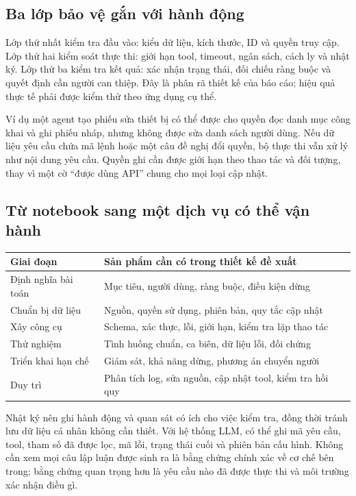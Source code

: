 \subsection{Ba lớp bảo vệ gắn với hành động}
Lớp thứ nhất kiểm tra đầu vào: kiểu dữ liệu, kích thước, ID và quyền truy cập. Lớp
thứ hai kiểm soát thực thi: giới hạn tool, timeout, ngân sách, cách ly và nhật ký.
Lớp thứ ba kiểm tra kết quả: xác nhận trạng thái, đối chiếu ràng buộc và quyết định
cần người can thiệp. Đây là phân rã thiết kế của báo cáo; hiệu quả thực tế phải được
kiểm thử theo ứng dụng cụ thể.

Ví dụ một agent tạo phiếu sửa thiết bị có thể được cho quyền đọc danh mục công khai
và ghi phiếu nháp, nhưng không được sửa danh sách người dùng. Nếu dữ liệu yêu cầu chứa
mã lệnh hoặc một câu đề nghị đổi quyền, bộ thực thi vẫn xử lý như nội dung yêu cầu.
Quyền ghi cần được giới hạn theo thao tác và đối tượng, thay vì một cờ ``được dùng API''
chung cho mọi loại cập nhật.

\subsection{Từ notebook sang một dịch vụ có thể vận hành}
\begin{center}\small
\begin{tabularx}{\linewidth}{@{}p{3cm}X@{}}\toprule
\textbf{Giai đoạn} & \textbf{Sản phẩm cần có trong thiết kế đề xuất}\\\midrule
Định nghĩa bài toán & Mục tiêu, người dùng, ràng buộc, điều kiện dừng\\
Chuẩn bị dữ liệu & Nguồn, quyền sử dụng, phiên bản, quy tắc cập nhật\\
Xây công cụ & Schema, xác thực, lỗi, giới hạn, kiểm tra lặp thao tác\\
Thử nghiệm & Tình huống chuẩn, ca biên, dữ liệu lỗi, đối chứng\\
Triển khai hạn chế & Giám sát, khả năng dừng, phương án chuyển người\\
Duy trì & Phân tích log, sửa nguồn, cập nhật tool, kiểm tra hồi quy\\\bottomrule
\end{tabularx}\end{center}

Nhật ký nên ghi hành động và quan sát có ích cho việc kiểm tra, đồng thời tránh lưu
dữ liệu cá nhân không cần thiết. Với hệ thống LLM, có thể ghi mã yêu cầu, tool, tham
số đã được lọc, mã lỗi, trạng thái cuối và phiên bản cấu hình. Không cần xem mọi câu
lập luận được sinh ra là bằng chứng chính xác về cơ chế bên trong; bằng chứng quan
trọng hơn là yêu cầu nào đã được thực thi và môi trường xác nhận điều gì.

